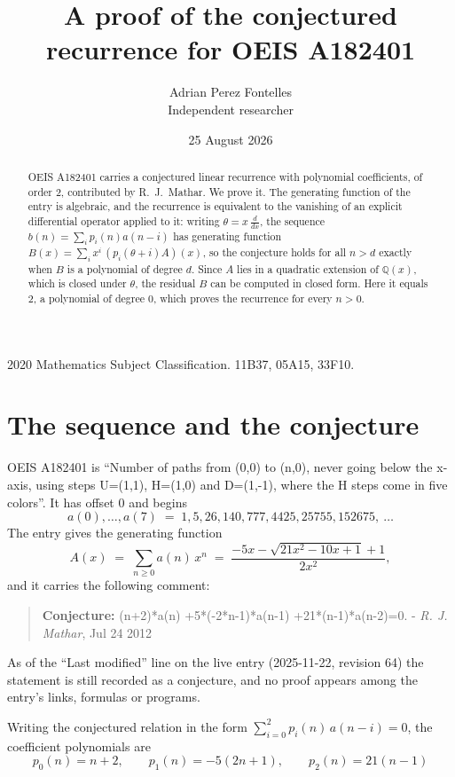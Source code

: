 \documentclass[11pt,a4paper]{article}
\title{A proof of the conjectured recurrence for OEIS A182401}
\author{Adrian Perez Fontelles\\ \small Independent researcher}
\date{25 August 2026}
\theoremstyle{plain}
\theoremstyle{definition}
\begin{document}
\maketitle

\begin{abstract}
OEIS A182401 carries a conjectured linear recurrence with polynomial coefficients, of
order 2, contributed by R.~J.~Mathar. We prove it. The generating function of the
entry is algebraic, and the recurrence is equivalent to the vanishing of an explicit
differential operator applied to it: writing $\theta=x\,\frac{d}{dx}$, the sequence
$b(n)=\sum_{i}p_{i}(n)a(n-i)$ has generating function
$B(x)=\sum_{i}x^{i}\,(p_{i}(\theta+i)A)(x)$, so the conjecture holds for all $n>d$ exactly
when $B$ is a polynomial of degree $d$. Since $A$ lies in a quadratic extension of
$\mathbb{Q}(x)$, which is closed under $\theta$, the residual $B$ can be computed in
closed form. Here it equals $2$, a polynomial of degree $0$, which proves
the recurrence for every $n>0$.
\end{abstract}

\noindent\small 2020 Mathematics Subject Classification. 11B37, 05A15, 33F10.\normalsize

\section{The sequence and the conjecture}

OEIS A182401 is ``Number of paths from (0,0) to (n,0), never going below the x-axis, using steps U=(1,1), H=(1,0) and D=(1,-1), where the H steps come in five colors''. It has offset $0$ and begins
\[
a(0),\dots,a(7)\;=\;1, 5, 26, 140, 777, 4425, 25755, 152675,\ \dots
\]
The entry gives the generating function
\begin{equation}\label{eq:gf}
A(x)\;=\;\sum_{n\ge 0} a(n)\,x^{n}\;=\;\frac{- 5 x - \sqrt{21 x^{2} - 10 x + 1} + 1}{2 x^{2}} ,
\end{equation}
and it carries the following comment:
\begin{quote}\small
\textbf{Conjecture:} (n+2)*a(n) +5*(-2*n-1)*a(n-1) +21*(n-1)*a(n-2)=0. - \emph{R. J. Mathar}, Jul 24 2012
\end{quote}
As of the ``Last modified'' line on the live entry (2025-11-22, revision 64) the
statement is still recorded as a conjecture, and no proof appears among the entry's links,
formulas or programs.

Writing the conjectured relation in the form $\sum_{i=0}^{2}p_{i}(n)\,a(n-i)=0$,
the coefficient polynomials are
\[
p_{0}(n)=n + 2,\qquad p_{1}(n)=- 5 \left(2 n + 1\right),\qquad p_{2}(n)=21 \left(n - 1\right)
\]
\end{document}
